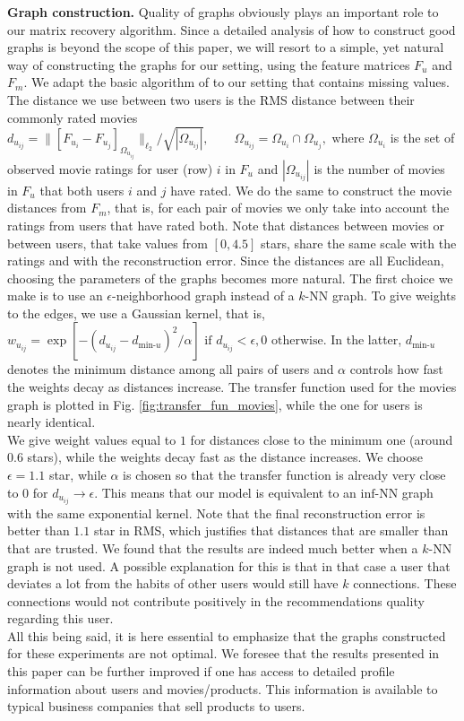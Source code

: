 \documentclass{article}
\begin{document}
{\bf Graph construction.}
Quality of graphs obviously plays an important role to our matrix recovery algorithm. Since a detailed analysis of how to construct good graphs is beyond the scope of this paper, we will resort to a simple, yet natural way of constructing the graphs for our setting, using the feature matrices $F_u$ and $F_m$. We adapt the basic algorithm of \cite{belkin2003laplacian} to our setting that contains missing values. \\
The distance we use between two users is the RMS distance between their commonly rated movies
$d_{u_{ij}} = \|\left[F_{u_i} - F_{u_j}\right]_{\Omega_{u_{ij}}}\|_{\ell_2} / \sqrt{|\Omega_{u_{ij}}|}, \qquad\Omega_{u_{ij}} = \Omega_{u_i} \cap \Omega_{u_j},$ where $\Omega_{u_i}$ is the set of observed movie ratings for user (row) $i$ in $F_u$ and $|\Omega_{u_{ij}}|$ is the number of movies in $F_u$ that both users $i$ and $j$ have rated. We do the same to construct the movie distances from $F_m$, that is, for each pair of movies we only take into account the ratings from users that have rated both. Note that distances between movies or between users, that take values from $[0, 4.5]$ stars, share the same scale with the ratings and with the reconstruction error. Since the distances are all Euclidean, choosing the parameters of the graphs becomes more natural. The first choice we make is to use an $\epsilon$-neighborhood graph instead of a $k$-NN graph. To give weights to the edges, we use a Gaussian kernel, that is, $w_{u_{ij}} = \exp\left[-\left(d_{u_{ij}} - d_{\text{min-}u}\right)^2/\alpha\right] \text{ if } d_{u_{ij}} < \epsilon, 0 \text{ otherwise}$. In the latter, $d_{\text{min-}u}$ denotes the minimum distance among all pairs of users and $\alpha$ controls how fast the weights decay as distances increase. The transfer function used for the movies graph is plotted in Fig. \ref{fig:transfer_fun_movies}, while the one for users is nearly identical.\\
We give weight values equal to $1$ for distances close to the minimum one (around $0.6$ stars), while the weights decay fast as the distance increases. We choose $\epsilon = 1.1$ star, while $\alpha$ is chosen so that the transfer function is already very close to $0$ for $d_{u_{ij}}\rightarrow \epsilon$. This means that our model is equivalent to an $\text{inf}$-NN graph with the same exponential kernel. Note that the final reconstruction error is better than $1.1$ star in RMS, which justifies that distances that are smaller than that are trusted. We found that the results are indeed much better when a $k$-NN graph is not used. A possible explanation for this is that in that case a user that deviates a lot from the habits of other users would still have $k$ connections. These connections would not contribute positively in the recommendations quality regarding this user. \\ 
All this being said, it is here essential to emphasize that the graphs constructed for these experiments are not optimal. We foresee that the results presented in this paper can be further improved if one has access to detailed profile information about users and movies/products. This information is available to typical business companies that sell products to users.
\end{document}
